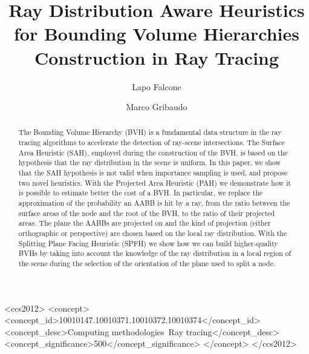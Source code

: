 \documentclass[acmtog, anonymous, review]{acmart}
\begin{document}
\title[Ray Distribution Aware Heuristics for BVHs Construction in Ray Tracing]{Ray Distribution Aware Heuristics for Bounding Volume Hierarchies Construction in Ray Tracing}

\author{Lapo Falcone}

\author{Marco Gribaudo}

\renewcommand{\shortauthors}{Falcone, Gribaudo}

\begin{abstract}
  The Bounding Volume Hierarchy (BVH) is a fundamental data structure in the ray tracing algorithms to accelerate the detection of ray-scene intersections. The Surface Area Heuristic (SAH), employed during the construction of the BVH, is based on the hypothesis that the ray distribution in the scene is uniform. In this paper, we show that the SAH hypothesis is not valid when importance sampling is used, and propose two novel heuristics. With the Projected Area Heuristic (PAH) we demonstrate how it is possible to estimate better the cost of a BVH. In particular, we replace the approximation of the probability an AABB is hit by a ray, from the ratio between the surface areas of the node and the root of the BVH, to the ratio of their projected areas. The plane the AABBs are projected on and the kind of projection (either orthographic or perspective) are chosen based on the local ray distribution. With the Splitting Plane Facing Heuristic (SPFH) we show how we can build higher-quality BVHs by taking into account the knowledge of the ray distribution in a local region of the scene during the selection of the orientation of the plane used to split a node.
\end{abstract}

\begin{CCSXML}
  <ccs2012>
     <concept>
         <concept_id>10010147.10010371.10010372.10010374</concept_id>
         <concept_desc>Computing methodologies~Ray tracing</concept_desc>
         <concept_significance>500</concept_significance>
         </concept>
   </ccs2012>
\end{CCSXML}
  
\end{document}
